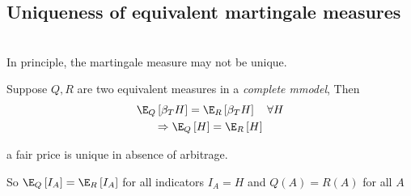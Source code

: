 \subsection{Uniqueness of equivalent martingale measures}\hfill\\
\noindent In principle, the martingale measure may not be unique.\par
\noindent Suppose $Q,R$ are two equivalent measures in a \textit{complete mmodel}, Then
\begin{equation*}
  \begin{gathered}
    \E_Q\left[\beta_TH\right] = \E_R\left[\beta_T H\right]\quad\forall H\\
    \Rightarrow \E_Q\left[H\right] = \E_R\left[H\right]
  \end{gathered}
\end{equation*}\par
\noindent a fair price is unique in absence of arbitrage.\par
\noindent So $\E_Q\left[I_A\right] = \E_R\left[I_A\right]$ for all indicators $I_A = H$ and $Q(A) = R(A)$ for all $A$
